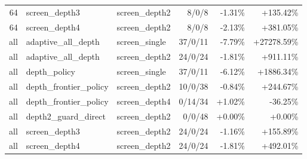 \begin{tabular}{rllrrr}
64 & screen_depth3 & screen_depth2 & 8/0/8 & -1.31\% & +135.42\% \\
64 & screen_depth4 & screen_depth2 & 8/0/8 & -2.13\% & +381.05\% \\
all & adaptive_all_depth & screen_single & 37/0/11 & -7.79\% & +27278.59\% \\
all & adaptive_all_depth & screen_depth2 & 24/0/24 & -1.81\% & +911.11\% \\
all & depth_policy & screen_single & 37/0/11 & -6.12\% & +1886.34\% \\
all & depth_frontier_policy & screen_depth2 & 10/0/38 & -0.84\% & +244.67\% \\
all & depth_frontier_policy & screen_depth4 & 0/14/34 & +1.02\% & -36.25\% \\
all & depth2_guard_direct & screen_depth2 & 0/0/48 & +0.00\% & +0.00\% \\
all & screen_depth3 & screen_depth2 & 24/0/24 & -1.16\% & +155.89\% \\
all & screen_depth4 & screen_depth2 & 24/0/24 & -1.81\% & +492.01\% \\
\bottomrule
\end{tabular}
